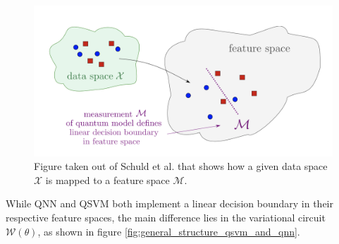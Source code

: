 \begin{figure}[!h]
    \centering
    \includegraphics[width=0.7\linewidth]{thesis/Figures/qnn/2101.11020_Maria_Schuld_Fig.3.png} 
    \caption{Figure taken out of Schuld et al.\cite{schuld_SQMLmodelsAreKernelMethods} that shows how a given data space $\mathcal{X}$ is mapped to a feature space $\mathcal{M}$.}
    \label{figure:2101.11020_Maria_Schuld_Fig.3}
\end{figure}

\clearpage

While QNN and QSVM both implement a linear decision boundary in their respective feature spaces, the main difference lies in the variational circuit $\mathcal{W}(\theta)$, as shown in figure \ref{fig:general_structure_qsvm_and_qnn}.

